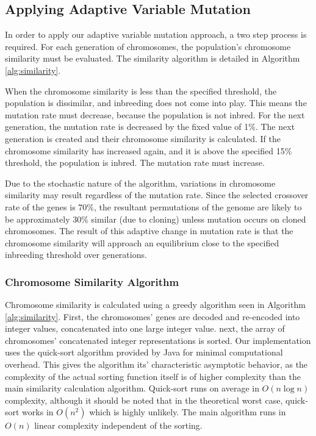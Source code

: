 \documentclass{sig-alternate}
\begin{document}
\subsection{Applying Adaptive Variable Mutation}
In order to apply our adaptive variable mutation approach, a two step process is required. For each generation of chromosomes, the population's chromosome similarity must be evaluated. The similarity algorithm is detailed in Algorithm \ref{alg:similarity}.  

When the chromosome similarity is less than the specified threshold, the population is dissimilar, and inbreeding does not come into play. This means the mutation rate must decrease, because the population is not inbred. For the next generation, the mutation rate is decreased by the fixed value of 1\%. The next generation is created and their chromosome similarity is calculated. If the chromosome similarity has increased again, and it is above the specified 15\% threshold, the population is inbred. The mutation rate must increase. 

Due to the stochastic nature of the algorithm, variations in chromosome similarity may result regardless of the mutation rate. Since the selected crossover rate of the genes is 70\%, the resultant permutations of the genome are likely to be approximately 30\% similar (due to cloning) unless mutation occurs on cloned chromosomes. The result of this adaptive change in mutation rate is that the chromosome similarity will approach an equilibrium close to the specified inbreeding threshold over generations.

\subsubsection{Chromosome Similarity Algorithm}
Chromosome similarity is calculated using a greedy algorithm seen in Algorithm \ref{alg:similarity}. First, the chromosomes' genes are decoded and re-encoded into integer values, concatenated into one large integer value. next, the array of chromosomes' concatenated integer representations is sorted. Our implementation uses the quick-sort algorithm provided by Java for minimal computational overhead. This gives the algorithm its' characteristic asymptotic behavior, as the complexity of the actual sorting function itself is of higher complexity than the main similarity calculation algorithm. Quick-sort runs on average in $O(n \log n)$ complexity, although it should be noted that in the theoretical worst case, quick-sort works in $O(n^2)$ which is highly unlikely. The main algorithm runs in $O(n)$ linear complexity independent of the sorting.
\end{document}
